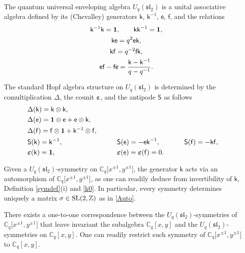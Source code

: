 \documentclass[pdftex]{sigma}
\numberwithin{equation}{section}
\begin{document}
The quantum universal enveloping algebra $U_q(\mathfrak{sl}_2)$ is a unital associative algebra defined by its (Chevalley) generators $\mathsf{k}$, $\mathsf{k}^{-1}$, $\mathsf{e}$, $\mathsf{f}$, and the relations
\begin{gather}
\mathsf{k}^{-1}\mathsf{k} =\mathbf{1},\qquad\mathsf{kk}^{-1}=\mathbf{1},\notag\\
\mathsf{ke} =q^2\mathsf{ek},\label{ke}\\
\mathsf{kf} =q^{-2}\mathsf{fk},\label{kf}\\
\mathsf{ef}-\mathsf{fe} =\frac{\mathsf{k}-\mathsf{k}^{-1}}{q-q^{-1}}. \label{effe}
\end{gather}

The standard Hopf algebra structure on $U_q(\mathfrak{sl}_2)$ is determined by the comultiplication $\Delta$, the counit $\boldsymbol\varepsilon$, and the antipode $\mathsf{S}$ as follows
\begin{alignat}{4}
&\Delta(\mathsf{k})=\mathsf{k}\otimes\mathsf{k}, && && & \label{k0}\\
& \Delta(\mathsf{e}) =\mathbf{1}\otimes\mathsf{e}+ \mathsf{e}\otimes\mathsf{k}, && && & \label{def}\\
& \Delta(\mathsf{f}) =\mathsf{f}\otimes\mathbf{1}+\mathsf{k}^{-1}\otimes\mathsf{f},\qquad && && & \label{def1}\\
& \mathsf{S}(\mathsf{k}) =\mathsf{k}^{-1}, && \mathsf{S}(\mathsf{e}) =-\mathsf{ek}^{-1}, \qquad && \mathsf{S}(\mathsf{f}) =-\mathsf{kf}, &\notag\\
& \boldsymbol{\varepsilon}(\mathsf{k}) =\mathbf{1}, && \boldsymbol{\varepsilon}(\mathsf{e}) =\boldsymbol{\varepsilon}(\mathsf{f})=0.\qquad && &\notag
\end{alignat}

Given a $U_q(\mathfrak{sl}_2)$-symmetry on $\mathbb{C}_q\big[x^{\pm 1},y^{\pm 1}\big]$, the generator $\mathsf{k}$ acts via an automorphism of $\mathbb{C}_q\big[x^{\pm 1},y^{\pm 1}\big]$, as one can readily deduce from invertibility of $\mathsf{k}$, Definition \ref{symdef}(i) and \eqref{k0}. In particular, every symmetry determines uniquely a matrix $\sigma\in {\rm SL}(2,\mathbb{Z})$ as in \eqref{Auto}.

There exists a one-to-one correspondence between the $U_q(\mathfrak{sl}_2)$-symmetries of $\mathbb{C}_q\big[x^{\pm 1},y^{\pm 1}\big]$ that leave invariant the subalgebra $\mathbb{C}_q[x,y]$ and the $U_q(\mathfrak{sl}_2)$-symmetries on $\mathbb{C}_q[x,y]$. One can readily restrict such symmetry of $\mathbb{C}_q\big[x^{\pm 1},y^{\pm 1}\big]$ to $\mathbb{C}_q[x,y]$.
\end{document}
